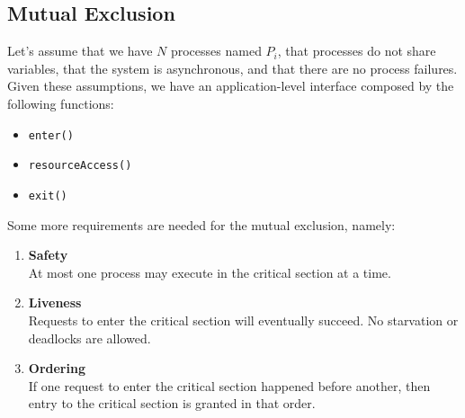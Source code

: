 \documentclass{article}
\begin{document}
\subsection{Mutual Exclusion}
Let's assume that we have $N$ processes named $P_i$, that processes do not share variables, that the system is asynchronous, and that there are no process failures. Given these assumptions, we have an application-level interface composed by the following functions:
\begin{itemize}
	\item \verb|enter()|
	\item \verb|resourceAccess()|
	\item \verb|exit()|
\end{itemize}
Some more requirements are needed for the mutual exclusion, namely:
\begin{enumerate}
	\item \textbf{Safety} \\
	At most one process may execute in the critical section at a time.
	\item \textbf{Liveness} \\
	Requests to enter the critical section will eventually succeed. No starvation or deadlocks are allowed.
	\item \textbf{Ordering} \\
	If one request to enter the critical section happened before another, then entry to the critical section is granted in that order.
\end{enumerate}
\end{document}
